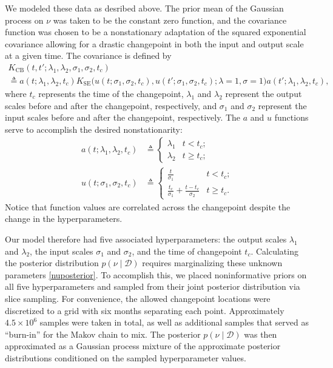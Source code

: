 \documentclass{article}
\newcommand{\deq}{\triangleq}
\newcommand{\cm}[1]{\mathcal{#1}}
\newcommand{\data}{\cm{D}}
\newcommand{\given}{\mid}
\begin{document}
We modeled these data as desribed above.  The prior mean of the
Gaussian process on $\nu$ was taken to be the constant zero function,
and the covariance function was chosen to be a nonstationary
adaptation of the squared exponential covariance allowing for a
drastic changepoint in both the input and output scale at a given
time.  The covariance is defined by
\begin{multline*}
  K_{\text{CB}}
  (t, t'; \lambda_1, \lambda_2, \sigma_1, \sigma_2, t_c)
  \\
  \deq
  a(t; \lambda_1, \lambda_2, t_c)
  K_{\text{SE}}
  \bigl(
    u(t; \sigma_1, \sigma_2, t_c),
    u(t'; \sigma_1, \sigma_2, t_c)
    ;
    \lambda = 1, \sigma = 1
  \bigr)
  a(t'; \lambda_1, \lambda_2, t_c),
\end{multline*}
where $t_c$ represents the time of the changepoint, $\lambda_1$ and
$\lambda_2$ represent the output scales before and after the
changepoint, respectively, and $\sigma_1$ and $\sigma_2$ represent the
input scales before and after the changepoint, respectively.  The $a$
and $u$ functions serve to accomplish the desired nonstationarity:
\begin{align*}\label{eq:ufundef}
  a(t; \lambda_1, \lambda_2, t_c) 
  &\deq
  \begin{cases}
    \lambda_1 & t < t_c; \\
    \lambda_2 & t \geq t_c;
  \end{cases}
  \\
  u(t; \sigma_1, \sigma_2, t_c) 
  &\deq
  \begin{cases}
    \frac{t}{\sigma_1} 
    & t < t_c; \\
    \frac{t_c}{\sigma_1} + \frac{t - t_c}{\sigma_2} 
    & t \geq t_c.
  \end{cases}
\end{align*}
Notice that function values are correlated across the changepoint
despite the change in the hyperparameters.

Our model therefore had five associated hyperparameters: the output
scales $\lambda_1$ and $\lambda_2$, the input scales $\sigma_1$ and
$\sigma_2$, and the time of changepoint $t_c$.  Calculating the
posterior distribution $p(\nu \given \data)$ requires marginalizing
these unknown parameters \eqref{nuposterior}.  To accomplish this, we
placed noninformative priors on all five hyperparameters and sampled
from their joint posterior distribution via slice sampling.  For
convenience, the allowed changepoint locations were discretized to a
grid with six months separating each point.  Approximately $4.5 \times
10^6$ samples were taken in total, as well as additional samples that
served as ``burn-in'' for the Makov chain to mix.  The posterior
$p(\nu \given \data)$ was then approximated as a Gaussian process
mixture of the approximate posterior distributions conditioned on the
sampled hyperparameter values.
\end{document}
